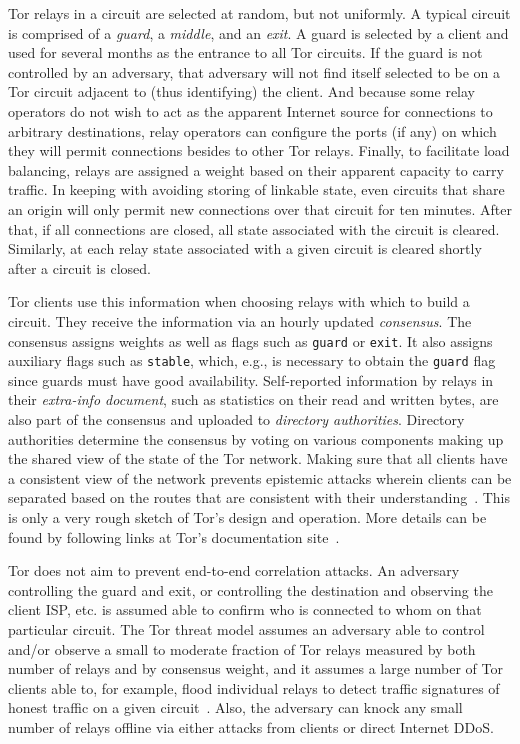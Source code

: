 Tor relays in a circuit are selected at random, but not uniformly. A typical
circuit is comprised of a \emph{guard}, a \emph{middle}, and an \emph{exit}. A
guard is selected by a client and used for several months as the entrance to all
Tor circuits. If the guard is not controlled by an adversary, that adversary
will not find itself selected to be on a Tor circuit adjacent to (thus
identifying) the client. And because some relay operators do not wish to act as
the apparent Internet source for connections to arbitrary destinations, relay
operators can configure the ports (if any) on which they will permit connections
besides to other Tor relays. Finally, to facilitate load balancing, relays are
assigned a weight based on their apparent capacity to carry traffic. In keeping
with avoiding storing of linkable state, even circuits that share an origin will
only permit new connections over that circuit for ten minutes. After that, if
all connections are closed, all state associated with the circuit is cleared.
Similarly, at each relay state associated with a given circuit is cleared
shortly after a circuit is closed.

Tor clients use this information when choosing relays with which to build a
circuit. They receive the information via an hourly updated \emph{consensus}.
The consensus assigns weights as well as flags such as \texttt{guard} or
\texttt{exit}. It also assigns auxiliary flags such as
\texttt{stable}, which, e.g.,
is necessary to obtain the \texttt{guard} flag since guards must have good
availability. Self-reported information by relays in their \emph{extra-info
document}, such as statistics on their read and written bytes, are also part of
the consensus and uploaded to \emph{directory authorities}. Directory
authorities determine the consensus by voting on various components making up
the shared view of the state of the Tor network. Making sure that all clients
have a consistent view of the network prevents epistemic attacks wherein clients
can be separated based on the routes that are consistent with their
understanding~\cite{danezis:pets2008}. This is only a very rough sketch of Tor's
design and operation.  More details can be found by following links at Tor's
documentation site~\cite{tor-documentation}.

Tor does not aim to prevent end-to-end correlation attacks. An adversary
controlling the guard and exit, or controlling the destination and observing the
client ISP, etc. is assumed able to confirm who is connected to whom on that
particular circuit. The Tor threat model assumes an adversary able to control
and/or observe a small to moderate fraction of Tor relays measured by both
number of relays and by consensus weight, and it assumes a large
number of Tor clients
able to, for example, flood individual relays to detect traffic signatures of
honest traffic on a given circuit~\cite{long-paths}. Also, the adversary can
knock any small number of relays offline via either attacks from clients or
direct Internet DDoS. 
